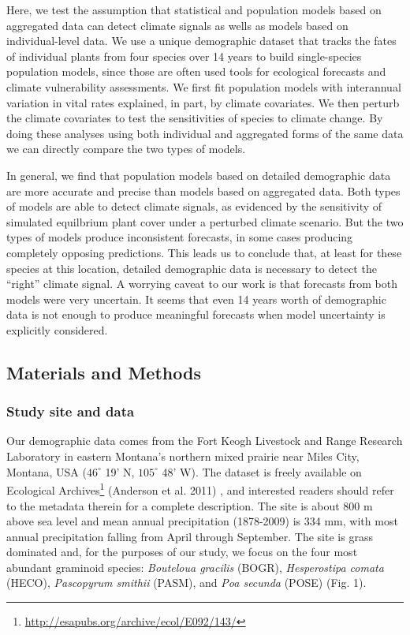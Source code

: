 \documentclass[12pt,]{article}
\begin{document}
Here, we test the assumption that statistical and population models
based on aggregated data can detect climate signals as wells as models
based on individual-level data. We use a unique demographic dataset that
tracks the fates of individual plants from four species over 14 years to
build single-species population models, since those are often used tools
for ecological forecasts and climate vulnerability assessments. We first
fit population models with interannual variation in vital rates
explained, in part, by climate covariates. We then perturb the climate
covariates to test the sensitivities of species to climate change. By
doing these analyses using both individual and aggregated forms of the
same data we can directly compare the two types of models.

In general, we find that population models based on detailed demographic
data are more accurate and precise than models based on aggregated data.
Both types of models are able to detect climate signals, as evidenced by
the sensitivity of simulated equilbrium plant cover under a perturbed
climate scenario. But the two types of models produce inconsistent
forecasts, in some cases producing completely opposing predictions. This
leads us to conclude that, at least for these species at this location,
detailed demographic data is necessary to detect the ``right'' climate
signal. A worrying caveat to our work is that forecasts from both models
were very uncertain. It seems that even 14 years worth of demographic
data is not enough to produce meaningful forecasts when model
uncertainty is explicitly considered.

\subsection{Materials and Methods}\label{materials-and-methods}

\subsubsection{Study site and data}\label{study-site-and-data}

Our demographic data comes from the Fort Keogh Livestock and Range
Research Laboratory in eastern Montana's northern mixed prairie near
Miles City, Montana, USA ($46^{\circ}$ 19' N, $105^{\circ}$ 48' W). The
dataset is freely available on Ecological Archives\footnote{\url{http://esapubs.org/archive/ecol/E092/143/}}
(Anderson et al. 2011) , and interested readers should refer to the
metadata therein for a complete description. The site is about 800 m
above sea level and mean annual precipitation (1878-2009) is 334 mm,
with most annual precipitation falling from April through September. The
site is grass dominated and, for the purposes of our study, we focus on
the four most abundant graminoid species: \emph{Bouteloua gracilis}
(BOGR), \emph{Hesperostipa comata} (HECO), \emph{Pascopyrum smithii}
(PASM), and \emph{Poa secunda} (POSE) (Fig. 1).
\end{document}
